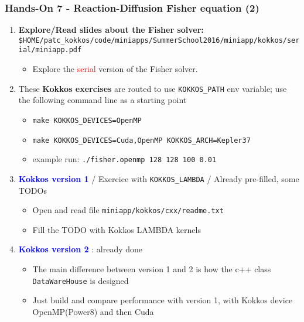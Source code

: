 \begin{frame}
  \frametitle{Hands-On 7 - Reaction-Diffusion Fisher equation (2)}

  \begin{enumerate}
  \item \textbf{Explore/Read slides about the Fisher solver:}\\
    {\footnotesize \texttt{\$HOME/patc\_kokkos/code/miniapps/SummerSchool2016/miniapp/kokkos/serial/miniapp.pdf}}
    \begin{itemize}
    \item Explore the \textcolor{red}{serial} version of the Fisher solver.
    \end{itemize}
  \item These \textbf{Kokkos exercises} are routed to use \texttt{KOKKOS\_PATH} env variable; use the following command line as a starting point
    \begin{itemize}
    \item \texttt{make KOKKOS\_DEVICES=OpenMP}
    \item \texttt{make KOKKOS\_DEVICES=Cuda,OpenMP KOKKOS\_ARCH=Kepler37}
    \item example run: \texttt{./fisher.openmp 128 128 100 0.01}
\end{itemize}
  \item \textcolor{blue}{\textbf{Kokkos version 1}} / Exercice with \texttt{KOKKOS\_LAMBDA} / Already pre-filled, some TODOs
    \begin{itemize}
    \item Open and read file \texttt{miniapp/kokkos/cxx/readme.txt}
    \item Fill the TODO with Kokkos LAMBDA kernels
    \end{itemize}
  \item \textcolor{blue}{\textbf{Kokkos version 2}} : already done
    \begin{itemize}
    \item The main difference between version 1 and 2 is how the c++ class \texttt{DataWareHouse} is designed
    \item Just build and compare performance with version 1, with Kokkos device OpenMP(Power8) and then Cuda
    \end{itemize}
  \end{enumerate}
\end{frame}

